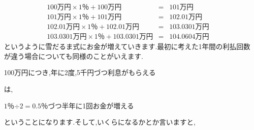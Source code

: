 \begin{eqnarray*}
100\mbox{万円} \times 1\mbox{％}  + 100\mbox{万円} &=& 101\mbox{万円}\\
101\mbox{万円} \times 1\mbox{％}  + 101\mbox{万円} &=& 102.01\mbox{万円}\\
102.01\mbox{万円} \times 1\mbox{％}  + 102.01\mbox{万円} &=& 103.0301\mbox{万円}\\
103.0301\mbox{万円} \times 1\mbox{％}  + 103.0301\mbox{万円} &=& 104.0604\mbox{万円}
\end{eqnarray*}
というように雪だるま式にお金が増えていきます.最初に考えた1年間の利払回数が違う場合についても同様のことがいえます.
\begin{center}
100万円につき,年に2度,5千円づつ利息がもらえる
\end{center}
は,
\begin{center}
$1$％$\div 2 = 0.5$％づつ半年に1回お金が増える
\end{center}
ということになります.そして,いくらになるかとか言いますと,

